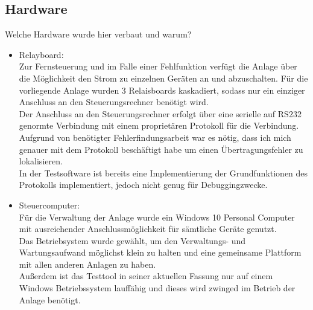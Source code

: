 \subsection{Hardware}
Welche Hardware wurde hier verbaut und warum?
\begin{itemize}
        \item Relayboard: \\
                Zur Fernsteuerung und im Falle einer Fehlfunktion verfügt die Anlage über die Möglichkeit den Strom zu einzelnen Geräten an und abzuschalten. Für die vorliegende Anlage wurden 3 Relaisboards kaskadiert, sodass nur ein einziger Anschluss an den Steuerungsrechner benötigt wird. \\
                Der Anschluss an den Steuerungsrechner erfolgt über eine serielle auf RS232 genormte Verbindung mit einem proprietären Protokoll für die Verbindung. Aufgrund von benötigter Fehlerfindungsarbeit war es nötig, dass ich mich genauer mit dem Protokoll beschäftigt habe um einen Übertragungsfehler zu lokalisieren. \\
                In der Testsoftware ist bereits eine Implementierung der Grundfunktionen des Protokolls implementiert, jedoch nicht genug für Debuggingzwecke.
        \item Steuercomputer: \\
                Für die Verwaltung der Anlage wurde ein Windows 10 Personal Computer mit ausreichender Anschlussmöglichkeit für sämtliche Geräte genutzt. \\
                Das Betriebsystem wurde gewählt, um den Verwaltungs- und Wartungsaufwand möglichst klein zu halten und eine gemeinsame Plattform mit allen anderen Anlagen zu haben. \\
                Außerdem ist das Testtool in seiner aktuellen Fassung nur auf einem Windows Betriebssystem lauffähig und dieses wird zwinged im Betrieb der Anlage benötigt.


\end{itemize}
